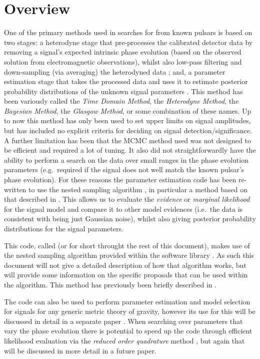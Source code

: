 \section{Overview}

One of the primary methods used in searches for \gws from known pulsars is based on two stages: a heterodyne
stage that pre-processes the calibrated \gw detector data by removing a signal's expected intrinsic phase
evolution (based on the observed solution from electromagnetic observations), whilst also low-pass filtering and
down-sampling (via averaging) the heterodyned data \citep{2005PhRvD..72j2002D}; and, a parameter estimation stage that takes the
processed data and uses it to estimate posterior probability distributions of the unknown signal parameters
\citep[e.g.\ using a Markov chain Monte Carlo (MCMC)][]{2010ApJ...713..671A}. This method has been variously
called the {\it Time Domain Method}, the {\it Heterodyne Method}, the {\it Bayesian Method}, the {\it Glasgow
Method}, or some combination of these names. Up to now this method has only been used to set upper limits
on signal amplitudes, but has included no explicit criteria for deciding on signal detection/significance. A further
limitation has been that the MCMC method used was not designed to be efficient and required a lot of tuning. It also
did not straightforwardly have the ability to perform a search on the data over small ranges in the phase
evolution parameters (e.g.\ required if the
\gw signal does not well match the known pulsar's phase evolution). For these reasons the parameter
estimation code has been re-written to use the nested sampling algorithm \citep{Skilling:2006}, in particular
a method based on that described in \citet{Veitch:2010}. This allows us to evaluate the {\it evidence} or {\it
marginal likelihood} for the signal model and compare it to other model evidences (i.e.\ the data is consistent with being just
Gaussian noise), whilst also giving posterior probability distributions for the signal parameters.

This code, called \lppenf (or \lppen for short throught the rest of this document), makes use of the nested sampling
algorithm provided within the \lalinf software library \citep{2015PhRvD..91d2003V}. As such this document will not
give a detailed description of how that algorithm works, but will provide some information on the specific proposals
that can be used within the algorithm. This method has previously been briefly described in \citet{2012JPhCS.363a2041P}.

The code can also be used to perform parameter estimation and model selection for signals for any generic
metric theory of gravity, however its use for this will be discussed in detail in a separate paper \citep{MaxCWpolariations}. When
searching over parameters that vary the phase evolution there is potential to speed up the code through
efficient likelihood evaluation via the {\it reduced order quadrature} method \citep[see, e.g.,][]{2014PhRvX...4c1006F,2015PhRvL.114g1104C},
but again that will be discussed in more detail in a future paper.

